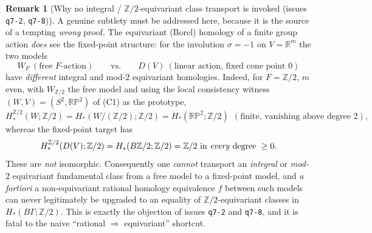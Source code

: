 \documentclass[12pt]{article}
\theoremstyle{definition}
\newtheorem{remark}[theorem]{Remark}
\begin{document}
\begin{remark}[Why no integral / $\mathbb{Z}/2$-equivariant class transport is
invoked (issues \texttt{q7-2}, \texttt{q7-8})]\label{rem:equiv-transport}
A genuine subtlety must be addressed here, because it is the source of a tempting
\emph{wrong} proof. The equivariant (Borel) homology of a finite group action
\emph{does} see the fixed-point structure: for the involution $\sigma=-1$ on
$V=\mathbb{R}^m$ the two models
\[
   W_F\ (\text{free }F\text{-action})\qquad\text{vs.}\qquad
   D(V)\ (\text{linear action, fixed cone point }0)
\]
have \emph{different} integral and mod-$2$ equivariant homologies. Indeed, for
$F=\mathbb{Z}/2$, $m$ even, with $W_{\mathbb{Z}/2}$ the free model and using the
local consistency witness $(W,V)=(S^2,\mathbb{RP}^2)$ of (C1) as the
prototype,
\[
   H^{\mathbb{Z}/2}_*(W;\mathbb{Z}/2)=H_*(W/(\mathbb{Z}/2);\mathbb{Z}/2)
   =H_*(\mathbb{RP}^2;\mathbb{Z}/2)\ \ (\text{finite, vanishing above degree }2),
\]
whereas the fixed-point target has
\[
   H^{\mathbb{Z}/2}_*(D(V);\mathbb{Z}/2)=H_*(B\mathbb{Z}/2;\mathbb{Z}/2)
   =\mathbb{Z}/2\ \text{in \emph{every} degree}\ \ge0 .
\]
These are \emph{not} isomorphic. Consequently one \emph{cannot} transport an
\emph{integral} or \emph{mod-$2$} equivariant fundamental class from a free model
to a fixed-point model, and \emph{a fortiori} a non-equivariant rational homology
equivalence $f$ between such models can never legitimately be upgraded to an
equality of $\mathbb{Z}/2$-equivariant classes in $H_*(B\Gamma;\mathbb{Z}/2)$.
This is exactly the objection of issues \texttt{q7-2} and \texttt{q7-8}, and it is
fatal to the naive ``rational $\Rightarrow$ equivariant'' shortcut.


\end{remark}
\end{document}
